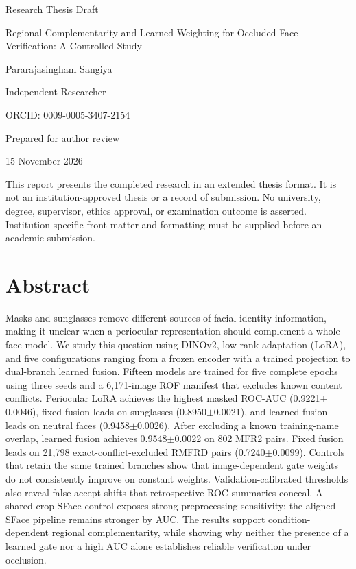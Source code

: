 \documentclass[12pt,a4paper,oneside]{report}
\begin{document}
\hypersetup{pageanchor=false}
\begin{titlepage}
\centering
\vspace*{12mm}
{\Large Research Thesis Draft\par}
\vspace{15mm}
{\LARGE Regional Complementarity and Learned Weighting for Occluded Face Verification: A Controlled Study\par}
\vspace{20mm}
{\Large Pararajasingham Sangiya\par}
\vspace{5mm}
Independent Researcher\par
ORCID: 0009-0005-3407-2154\par
\vfill
Prepared for author review\par
15 November 2026\par
\vspace{12mm}
\raggedright
This report presents the completed research in an extended thesis format. It is not an institution-approved thesis or a record of submission. No university, degree, supervisor, ethics approval, or examination outcome is asserted. Institution-specific front matter and formatting must be supplied before an academic submission.
\end{titlepage}
\hypersetup{pageanchor=true}
\chapter*{Abstract}
Masks and sunglasses remove different sources of facial identity information, making it unclear when a periocular representation should complement a whole-face model. We study this question using DINOv2, low-rank adaptation (LoRA), and five configurations ranging from a frozen encoder with a trained projection to dual-branch learned fusion. Fifteen models are trained for five complete epochs using three seeds and a 6,171-image ROF manifest that excludes known content conflicts. Periocular LoRA achieves the highest masked ROC-AUC (0.9221$\pm$0.0046), fixed fusion leads on sunglasses (0.8950$\pm$0.0021), and learned fusion leads on neutral faces (0.9458$\pm$0.0026). After excluding a known training-name overlap, learned fusion achieves 0.9548$\pm$0.0022 on 802 MFR2 pairs. Fixed fusion leads on 21,798 exact-conflict-excluded RMFRD pairs (0.7240$\pm$0.0099). Controls that retain the same trained branches show that image-dependent gate weights do not consistently improve on constant weights. Validation-calibrated thresholds also reveal false-accept shifts that retrospective ROC summaries conceal. A shared-crop SFace control exposes strong preprocessing sensitivity; the aligned SFace pipeline remains stronger by AUC. The results support condition-dependent regional complementarity, while showing why neither the presence of a learned gate nor a high AUC alone establishes reliable verification under occlusion.
\end{document}
